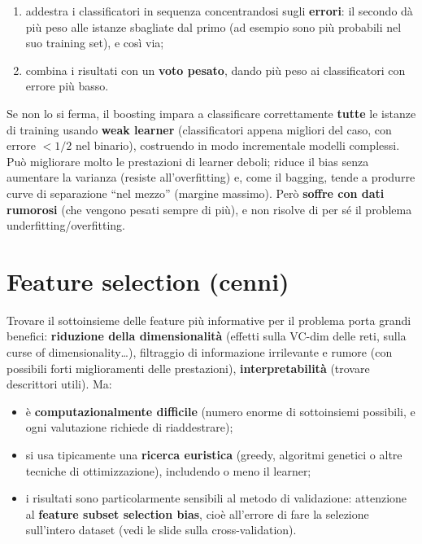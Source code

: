 \begin{enumerate}
\def\labelenumi{\arabic{enumi}.}
\tightlist
\item
  addestra i classificatori in sequenza concentrandosi sugli
  \textbf{errori}: il secondo dà più peso alle istanze sbagliate dal
  primo (ad esempio sono più probabili nel suo training set), e così
  via;
\item
  combina i risultati con un \textbf{voto pesato}, dando più peso ai
  classificatori con errore più basso.
\end{enumerate}

Se non lo si ferma, il boosting impara a classificare correttamente
\textbf{tutte} le istanze di training usando \textbf{weak learner}
(classificatori appena migliori del caso, con errore \(< 1/2\) nel
binario), costruendo in modo incrementale modelli complessi. Può
migliorare molto le prestazioni di learner deboli; riduce il bias senza
aumentare la varianza (resiste all'overfitting) e, come il bagging,
tende a produrre curve di separazione ``nel mezzo'' (margine massimo).
Però \textbf{soffre con dati rumorosi} (che vengono pesati sempre di
più), e non risolve di per sé il problema underfitting/overfitting.

\section{Feature selection (cenni)}\label{feature-selection-cenni}

Trovare il sottoinsieme delle feature più informative per il problema
porta grandi benefici: \textbf{riduzione della dimensionalità} (effetti
sulla VC-dim delle reti, sulla curse of dimensionality\ldots),
filtraggio di informazione irrilevante e rumore (con possibili forti
miglioramenti delle prestazioni), \textbf{interpretabilità} (trovare
descrittori utili). Ma:

\begin{itemize}
\tightlist
\item
  è \textbf{computazionalmente difficile} (numero enorme di sottoinsiemi
  possibili, e ogni valutazione richiede di riaddestrare);
\item
  si usa tipicamente una \textbf{ricerca euristica} (greedy, algoritmi
  genetici o altre tecniche di ottimizzazione), includendo o meno il
  learner;
\item
  i risultati sono particolarmente sensibili al metodo di validazione:
  attenzione al \textbf{feature subset selection bias}, cioè all'errore
  di fare la selezione sull'intero dataset (vedi le slide sulla
  cross-validation).
\end{itemize}


